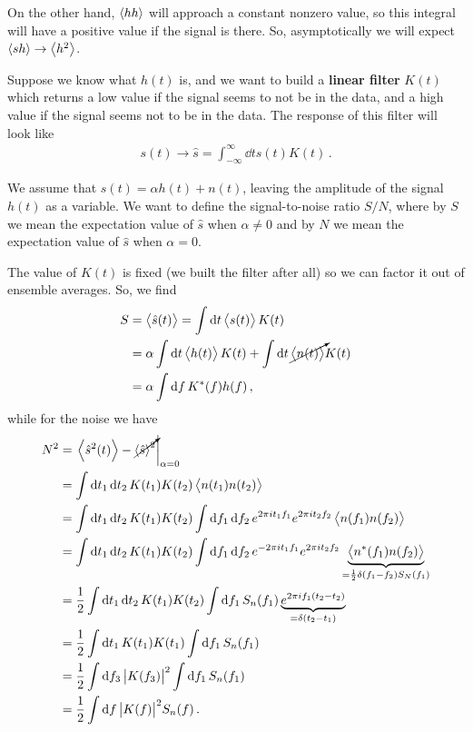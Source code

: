 \documentclass[main.tex]{subfiles}
\begin{document}
On the other hand, \(\expval{hh}\) will approach a constant nonzero value, so this integral will have a positive value if the signal is there.
So, asymptotically we will expect \(\expval{sh} \to \expval{h^2}\).

Suppose we know what \(h(t)\) is, and we want to build a \textbf{linear filter} \(K(t)\) which returns a low value if the signal seems to not be in the data, and a high value if the signal seems not to be in the data.
The response of this filter will look like 
%
\begin{align}
s(t) \to \hat{s} = \int_{- \infty}^{\infty } \dd{t} s(t) K(t)
\,.
\end{align}

We assume that \(s(t) = \alpha h(t) + n(t)\), leaving the amplitude of the signal \(h(t)\) as a variable. 
We want to define the signal-to-noise ratio \(S / N\), where by \(S\) we mean the expectation value of \(\hat{s}\) when \(\alpha \neq 0\) and by \(N\) we mean the expectation value of \(\hat{s}\) when \(\alpha = 0\).

The value of \(K(t)\) is fixed (we built the filter after all) so we can factor it out of ensemble averages. So, we find 
%
\begin{align}
S 
&= \expval{\hat{s}(t)}  = \int \dd{t} \expval{s(t)} K(t)  \\
&= \alpha \int \dd{t} \expval{h(t)} K(t) + \int \dd{t} \cancelto{}{\expval{n(t)}} K(t) \\
&= \alpha \int \dd{f} K^{*}(f) h(f)
\,,
\end{align}
%
while for the noise we have
%
\begin{align}
N^2 &= \eval{\expval{\hat{s}^2(t)} - \cancelto{}{\expval{\hat{s}}^2}}_{\alpha = 0 } \\
&= \int \dd{t_1 } \dd{t_2 } K(t_1) K(t_2) \expval{n(t_1 ) n(t_2 )}  \\
&= \int \dd{t_1 } \dd{t_2 } K(t_1) K(t_2)
\int \dd{f_1 } \dd{f_2 } e^{2 \pi i t_1 f_1 } e^{2 \pi i t_2 f_2 } \expval{n(f_1 ) n(f_2 )}  \\
&= \int \dd{t_1 } \dd{t_2 } K(t_1) K(t_2)
\int \dd{f_1 } \dd{f_2 } e^{-2 \pi i t_1 f_1 } e^{2 \pi i t_2 f_2 } \underbrace{\expval{n^{*}(f_1 ) n(f_2 )}}_{= \frac{1}{2} \delta (f_1 - f_2) S_N(f_1 )} \\
&= \frac{1}{2} \int \dd{t_1 } \dd{t_2 } K(t_1) K(t_2) 
\int \dd{f_1 } S_n(f_1 ) \underbrace{e^{2 \pi i f_1 (t_2 - t_2 )}}_{= \delta (t_2 - t_1 )} \\
&= \frac{1}{2} \int \dd{t_1 } K(t_1 )K(t_1 ) \int \dd{f_1 } S_n(f_1 ) \\
&= \frac{1}{2} \int \dd{f_3 } \abs{K(f_3 )}^2 \int \dd{f_1 } S_n (f_1 ) \\
&= \frac{1}{2} \int \dd{f} \abs{K(f)}^2 S_n(f)
\,.
\end{align}
\end{document}
